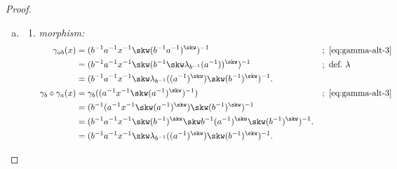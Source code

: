 \begin{proof}
\begin{enumerate}[a),font=\upshape]
    \item 
        \begin{enumerate}[-]
            \item \textit{morphism:}
                \begin{align*}
                    \gamma_{ab}(x)
                        &= (b^{-1}a^{-1}x^{-1}\skw(b^{-1}a^{-1})^\skw)^{-1}
                            &&;\ \eqref{eq:gamma-alt-3}\\
                        &= (b^{-1}a^{-1}x^{-1}\skw(b^{-1}
                            \skw\lambda_{b^{-1}}(a^{-1}))^\skw)^{-1}
                            &&;\ \text{def.~}\lambda\\
                        &= (b^{-1}a^{-1}x^{-1}\skw\lambda_{b^{-1}}((a^{-1})^\skw)
                            \skw(b^{-1})^\skw)^{-1}.\\
                    \gamma_b\circ\gamma_a(x)
                        &= \gamma_b((a^{-1}x^{-1}
                            \skw(a^{-1})^\skw)^{-1})
                            &&;\ \eqref{eq:gamma-alt-3}\\
                        &= (b^{-1}(a^{-1}x^{-1}\skw(a^{-1})^\skw)
                            \skw(b^{-1})^\skw)^{-1}\\
                        &= (b^{-1}a^{-1}x^{-1}\skw(b^{-1})^\skw
                            \skw b^{-1}(a^{-1})^\skw
                            \skw(b^{-1})^\skw)^{-1}.\\
                        &= (b^{-1}a^{-1}x^{-1}\skw\lambda_{b^{-1}}((a^{-1})^\skw)
                            \skw(b^{-1})^\skw)^{-1}.
                \end{align*}
            
                

\end{enumerate}
\end{enumerate}
\end{proof}
